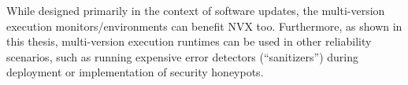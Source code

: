 While designed primarily in the context of software updates, the multi-version
execution monitors/environments can benefit NVX too. Furthermore, as shown in
this thesis, multi-version execution runtimes can be used in other reliability
scenarios, such as running expensive error detectors (``sanitizers'') during
deployment or implementation of security honeypots.




